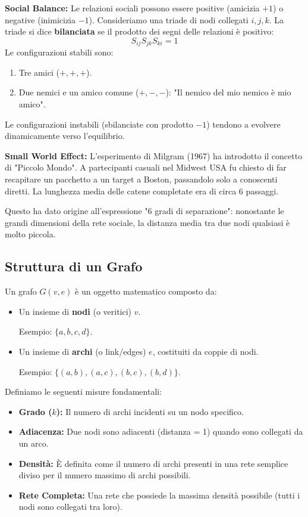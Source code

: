 \hfill 

\noindent \textbf{Social Balance:} Le relazioni sociali possono essere positive (amicizia $+1$) o negative (inimicizia $-1$). Consideriamo una triade di nodi collegati $i, j, k$. La triade si dice \textbf{bilanciata} se il prodotto dei segni delle relazioni è positivo:
\begin{equation}
    S_{ij} S_{jk} S_{ki} = 1
\end{equation}
Le configurazioni stabili sono:
\begin{enumerate}
    \item Tre amici ($+, +, +$).
    \item Due nemici e un amico comune ($+, -, -$): "Il nemico del mio nemico è mio amico".
\end{enumerate}
Le configurazioni instabili (sbilanciate con prodotto $-1$) tendono a evolvere dinamicamente verso l'equilibrio.

\hfill 

\noindent \textbf{Small World Effect:} L'esperimento di Milgram (1967) ha introdotto il concetto di "Piccolo Mondo".
A partecipanti casuali nel Midwest USA fu chiesto di far recapitare un pacchetto a un target a Boston, passandolo solo a conoscenti diretti. La lunghezza media delle catene completate era di circa 6 passaggi.

Questo ha dato origine all'espressione "6 gradi di separazione": nonostante le grandi dimensioni della rete sociale, la distanza media tra due nodi qualsiasi è molto piccola.


\subsection{Struttura di un Grafo}
Un grafo $G(v, e)$ è un oggetto matematico composto da:
\begin{itemize}
    \item Un insieme di \textbf{nodi} (o veritici) $v$.
    
    Esempio: $\{a, b, c, d\}$.
    \item Un insieme di \textbf{archi} (o link/edges) $e$, costituiti da coppie di nodi. 
    
    Esempio: $\{(a, b), (a, c), (b, c), (b, d)\}$.
\end{itemize}


\noindent Definiamo le seguenti misure fondamentali:
\begin{itemize}
    \item \textbf{Grado ($k$):} Il numero di archi incidenti su un nodo specifico.
    \item \textbf{Adiacenza:} Due nodi sono adiacenti (distanza = 1) quando sono collegati da un arco.
    \item \textbf{Densità:} È definita come il numero di archi presenti in una rete semplice diviso per il numero massimo di archi possibili.
    \item \textbf{Rete Completa:} Una rete che possiede la massima densità possibile (tutti i nodi sono collegati tra loro).
\end{itemize}

